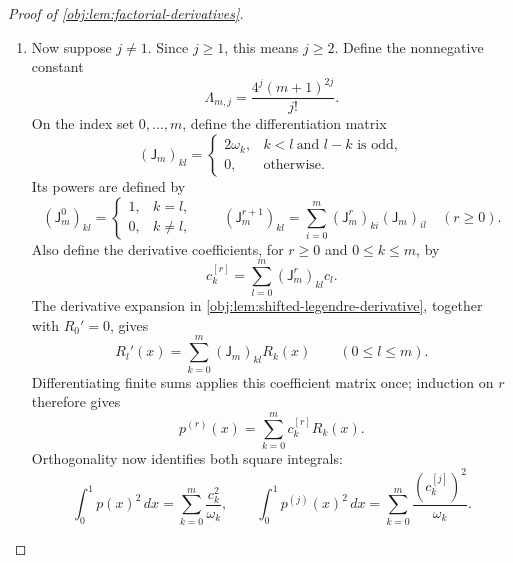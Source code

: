 \documentclass[11pt]{article}
\begin{document}
\begin{proof}[Proof of \cref{obj:lem:factorial-derivatives}]
\begin{enumerate}
For \(k\ge1\), \cref{obj:lem:shifted-legendre-derivative} supplies the derivative expansion. Orthogonality then gives
\[
\int_0^1 R_k'(x)^2\,dx
=
4\sum_{\substack{0\le i<k\\k-i\ \mathrm{odd}}}\omega_i
=
2k(k+1).
\]
For \(k=0\), the same identity holds because \(R_0(x)=1\) and \(R_0'(x)=0\). Integrating the pointwise bound therefore gives
\[
\int_0^1 p'(x)^2\,dx
\le
\mathcal E_p\sum_{k=0}^m\omega_k\,2k(k+1).
\]
Since \(0\le k\le m\) implies \(k(k+1)\le(m+1)^2\),
\[
\sum_{k=0}^m\omega_k\,2k(k+1)
\le
2(m+1)^2\sum_{k=0}^m\omega_k
=
2(m+1)^4
\le
4(m+1)^4.
\]
It follows that
\[
\int_0^1 p'(x)^2\,dx
\le
4(m+1)^4\mathcal E_p
\le
16(m+1)^4\mathcal E_p
=
\left(4(m+1)^2\sqrt{\mathcal E_p}\right)^2.
\]
Taking nonnegative square roots proves the required inequality when \(j=1\).

\item Now suppose \(j\ne1\). Since \(j\ge1\), this means \(j\ge2\). Define the nonnegative constant
\[
\Lambda_{m,j}=\frac{4^j(m+1)^{2j}}{j!}.
\]
On the index set \(0,\ldots,m\), define the differentiation matrix
\[
(\mathsf J_m)_{kl}
=
\begin{cases}
2\omega_k,&k<l\ \text{and }l-k\text{ is odd},\\
0,&\text{otherwise}.
\end{cases}
\]
Its powers are defined by
\[
(\mathsf J_m^0)_{kl}
=
\begin{cases}
1,&k=l,\\
0,&k\ne l,
\end{cases}
\qquad
(\mathsf J_m^{r+1})_{kl}
=
\sum_{i=0}^m(\mathsf J_m^r)_{ki}(\mathsf J_m)_{il}
\quad(r\ge0).
\]
Also define the derivative coefficients, for \(r\ge0\) and \(0\le k\le m\), by
\[
c_k^{[r]}=\sum_{l=0}^m(\mathsf J_m^r)_{kl}c_l.
\]
The derivative expansion in \cref{obj:lem:shifted-legendre-derivative}, together with \(R_0'=0\), gives
\[
R_l'(x)=\sum_{k=0}^m(\mathsf J_m)_{kl}R_k(x)
\qquad(0\le l\le m).
\]
Differentiating finite sums applies this coefficient matrix once; induction on \(r\) therefore gives
\[
p^{(r)}(x)=\sum_{k=0}^m c_k^{[r]}R_k(x).
\]
Orthogonality now identifies both square integrals:
\[
\int_0^1 p(x)^2\,dx
=
\sum_{k=0}^m\frac{c_k^2}{\omega_k},
\qquad
\int_0^1 p^{(j)}(x)^2\,dx
=
\sum_{k=0}^m\frac{(c_k^{[j]})^2}{\omega_k}.
\]


\end{enumerate}
\end{proof}
\end{document}
